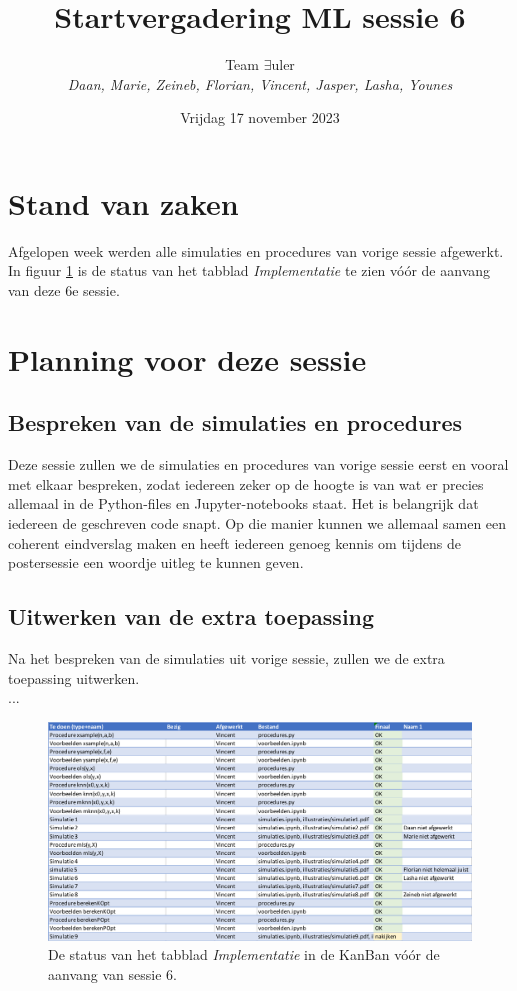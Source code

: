 \documentclass{article}
\title{Startvergadering ML sessie 6}
\author{Team $\exists$uler\\
	\textit{Daan, Marie, Zeineb, Florian, Vincent, Jasper, Lasha, Younes}}
\date{Vrijdag 17 november 2023}
\begin{document}
	
	\maketitle
	
	\section*{Stand van zaken}
	
	Afgelopen week werden alle simulaties en procedures van vorige sessie afgewerkt. In figuur \ref{fig:kanban} is de status van het tabblad \textit{Implementatie} te zien vóór de aanvang van deze 6e sessie.
	
	\section*{Planning voor deze sessie}
	
	\subsection*{Bespreken van de simulaties en procedures}
	
	Deze sessie zullen we de simulaties en procedures van vorige sessie eerst en vooral met elkaar bespreken, zodat iedereen zeker op de hoogte is van wat er precies allemaal in de Python-files en Jupyter-notebooks staat. Het is belangrijk dat iedereen de geschreven code snapt. Op die manier kunnen we allemaal samen een coherent eindverslag maken en heeft iedereen genoeg kennis om tijdens de postersessie een woordje uitleg te kunnen geven.
	
	\subsection*{Uitwerken van de extra toepassing}
	
	Na het bespreken van de simulaties uit vorige sessie, zullen we de extra toepassing uitwerken.
	\\
	...
	
	\begin{figure}
		\centering
		\includegraphics[width=1\textwidth]{kanban}
		\caption{De status van het tabblad \textit{Implementatie} in de KanBan vóór de aanvang van sessie 6.}
		\label{fig:kanban}
	\end{figure}
	
\end{document}
